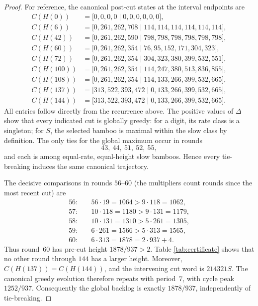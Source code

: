 \documentclass[11pt]{amsart}
\theoremstyle{remark}
\newcommand{\state}[2]{\bigl[#1\mid #2\bigr]}
\begin{document}
\begin{proof}
For reference, the canonical post-cut states at the interval
endpoints are
\begin{align*}
C(H(0))   &=\state{0,0,0,0}{0,0,0,0,0,0},\\
C(H(6))   &=\state{0,261,262,708}{114,114,114,114,114,114},\\
C(H(42))  &=\state{0,261,262,590}{798,798,798,798,798,798},\\
C(H(60))  &=\state{0,261,262,354}{76,95,152,171,304,323},\\
C(H(72))  &=\state{0,261,262,354}{304,323,380,399,532,551},\\
C(H(100)) &=\state{0,261,262,354}{114,247,380,513,836,855},\\
C(H(108)) &=\state{0,261,262,354}{114,133,266,399,532,665},\\
C(H(137)) &=\state{313,522,393,472}{0,133,266,399,532,665},\\
C(H(144)) &=\state{313,522,393,472}{0,133,266,399,532,665}.
\end{align*}
All entries follow directly from the recurrence above. The positive
values of $\Delta$ show that every indicated cut is globally greedy:
for a digit, its rate class is a singleton; for $S$, the selected
bamboo is maximal within the slow class by definition. The only ties
for the global maximum occur in rounds
\[
43,\ 44,\ 51,\ 52,\ 55,
\]
and each is among equal-rate, equal-height slow bamboos. Hence every
tie-breaking induces the same canonical trajectory.

The decisive comparisons in rounds $56$--$60$ (the multipliers count
rounds since the most recent cut) are
\begin{align*}
56:&\quad 56\cdot19=1064>9\cdot118=1062,\\
57:&\quad 10\cdot118=1180>9\cdot131=1179,\\
58:&\quad 10\cdot131=1310>5\cdot261=1305,\\
59:&\quad 6\cdot261=1566>5\cdot313=1565,\\
60:&\quad 6\cdot313=1878=2\cdot937+4.
\end{align*}
Thus round~$60$ has pre-cut height $1878/937>2$. Table
\ref{tab:certificate} shows that no other round through $144$ has a
larger height. Moreover, $C(H(137))=C(H(144))$, and the intervening
cut word is $214321S$. The canonical greedy evolution therefore
repeats with period~$7$, with cycle peak $1252/937$. Consequently the
global backlog is exactly $1878/937$, independently of tie-breaking.
\end{proof}
\end{document}
